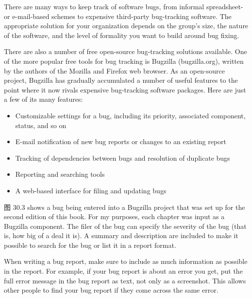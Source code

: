

There are many ways to keep track of software bugs, from informal spreadsheet- or e-mail-based schemes to expensive third-party bug-tracking software. The appropriate solution for your organization depends on the group’s size, the nature of the software, and the level of formality you want to build around bug fixing.

There are also a number of free open-source bug-tracking solutions available. One of the more popular free tools for bug tracking is Bugzilla (bugzilla.org), written by the authors of the Mozilla and Firefox web browser. As an open-source project, Bugzilla has gradually accumulated a number of useful features to the point where it now rivals expensive bug-tracking software packages. Here are just a few of its many features:

\begin{itemize}
\item
Customizable settings for a bug, including its priority, associated component, status, and so on

\item
E-mail notification of new bug reports or changes to an existing report

\item
Tracking of dependencies between bugs and resolution of duplicate bugs

\item
Reporting and searching tools

\item
A web-based interface for filing and updating bugs
\end{itemize}

图 30.3 shows a bug being entered into a Bugzilla project that was set up for the second edition of this book. For my purposes, each chapter was input as a Bugzilla component. The filer of the bug can specify the severity of the bug (that is, how big of a deal it is). A summary and description are included to make it possible to search for the bug or list it in a report format.


When writing a bug report, make sure to include as much information as possible in the report. For example, if your bug report is about an error you get, put the full error message in the bug report as text, not only as a screenshot. This allows other people to find your bug report if they come across the same error.

